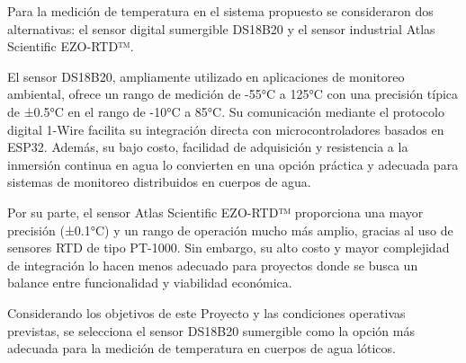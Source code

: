 Para la medición de temperatura en el sistema propuesto se consideraron dos alternativas: el sensor digital sumergible DS18B20 y el sensor industrial Atlas Scientific EZO-RTD™.

El sensor DS18B20, ampliamente utilizado en aplicaciones de monitoreo ambiental, ofrece un rango de medición de -55°C a 125°C con una precisión típica de ±0.5°C en el rango de -10°C a 85°C. Su comunicación mediante el protocolo digital 1-Wire facilita su integración directa con microcontroladores basados en ESP32. Además, su bajo costo, facilidad de adquisición y resistencia a la inmersión continua en agua lo convierten en una opción práctica y adecuada para sistemas de monitoreo distribuidos en cuerpos de agua.

Por su parte, el sensor Atlas Scientific EZO-RTD™ proporciona una mayor precisión (±0.1°C) y un rango de operación mucho más amplio, gracias al uso de sensores RTD de tipo PT-1000. Sin embargo, su alto costo y mayor complejidad de integración lo hacen menos adecuado para proyectos donde se busca un balance entre funcionalidad y viabilidad económica.

Considerando los objetivos de este Proyecto y las condiciones operativas previstas, se selecciona el sensor DS18B20 sumergible como la opción más adecuada para la medición de temperatura en cuerpos de agua lóticos.

